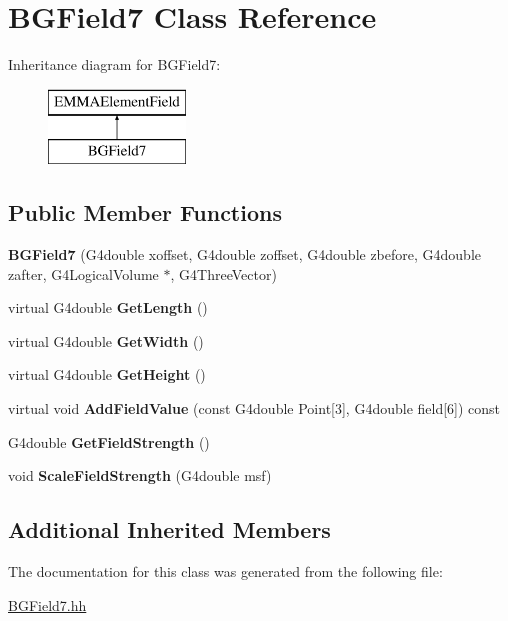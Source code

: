 \hypertarget{classBGField7}{\section{B\-G\-Field7 Class Reference}
\label{classBGField7}
}
Inheritance diagram for B\-G\-Field7\-:\begin{figure}[H]
\begin{center}
\leavevmode
\includegraphics[height=2.000000cm]{classBGField7}
\end{center}
\end{figure}
\subsection*{Public Member Functions}
\begin{DoxyCompactItemize}
\item 
\hypertarget{classBGField7_a7a8a66516a7c721f5bbc537a11c74611}{{\bfseries B\-G\-Field7} (G4double xoffset, G4double zoffset, G4double zbefore, G4double zafter, G4\-Logical\-Volume $\ast$, G4\-Three\-Vector)}\label{classBGField7_a7a8a66516a7c721f5bbc537a11c74611}

\item 
\hypertarget{classBGField7_a4a490c55acab01b0fdd558ed8117c20d}{virtual G4double {\bfseries Get\-Length} ()}\label{classBGField7_a4a490c55acab01b0fdd558ed8117c20d}

\item 
\hypertarget{classBGField7_a26a7446a2a71f53d7e6562636cbd6dec}{virtual G4double {\bfseries Get\-Width} ()}\label{classBGField7_a26a7446a2a71f53d7e6562636cbd6dec}

\item 
\hypertarget{classBGField7_af997fdbf9563607d88ea8846674054f0}{virtual G4double {\bfseries Get\-Height} ()}\label{classBGField7_af997fdbf9563607d88ea8846674054f0}

\item 
\hypertarget{classBGField7_ace0f21a51ad1076f9cc7fc4558ee2ef7}{virtual void {\bfseries Add\-Field\-Value} (const G4double Point\mbox{[}3\mbox{]}, G4double field\mbox{[}6\mbox{]}) const }\label{classBGField7_ace0f21a51ad1076f9cc7fc4558ee2ef7}

\item 
\hypertarget{classBGField7_a504c09a6ed73181e1131e745817d80e1}{G4double {\bfseries Get\-Field\-Strength} ()}\label{classBGField7_a504c09a6ed73181e1131e745817d80e1}

\item 
\hypertarget{classBGField7_af175b7fc74bed2669bfb3036d6475dbb}{void {\bfseries Scale\-Field\-Strength} (G4double msf)}\label{classBGField7_af175b7fc74bed2669bfb3036d6475dbb}

\end{DoxyCompactItemize}
\subsection*{Additional Inherited Members}


The documentation for this class was generated from the following file\-:\begin{DoxyCompactItemize}
\item 
\hyperlink{BGField7_8hh}{B\-G\-Field7.\-hh}\end{DoxyCompactItemize}
